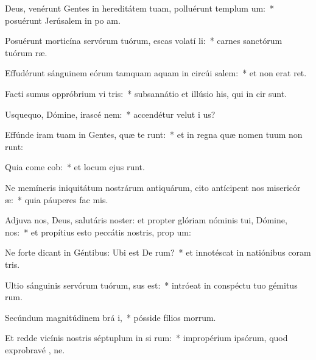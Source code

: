 \item Deus, venérunt Gentes in hereditátem tuam, polluérunt templum  um:~* posuérunt Jerúsalem in po am.
\item Posuérunt morticína servórum tuórum, escas volatí li:~* carnes sanctórum tuórum  ræ.
\item Effudérunt sánguinem eórum tamquam aquam in circúi salem:~* et non erat  ret.
\item Facti sumus oppróbrium vi tris:~* subsannátio et illúsio his, qui in cir  sunt.
\item Usquequo, Dómine, irascé  nem:~* accendétur velut i  us?
\item Effúnde iram tuam in Gentes, quæ te  runt:~* et in regna quæ nomen tuum non runt:
\item Quia come cob:~* et locum ejus runt.
\item Ne memíneris iniquitátum nostrárum antiquárum, cito antícipent nos misericór æ:~* quia páuperes fac  mis.
\item Adjuva nos, Deus, salutáris noster: et propter glóriam nóminis tui, Dómine,  nos:~* et propítius esto peccátis nostris, prop  um:
\item Ne forte dicant in Géntibus: Ubi est De rum?~* et innotéscat in natiónibus coram  tris.
\item Ultio sánguinis servórum tuórum,  sus est:~* intróeat in conspéctu tuo gémitus rum.
\item Secúndum magnitúdinem brá i,~* pósside fílios morrum.
\item Et redde vicínis nostris séptuplum in si rum:~* impropérium ipsórum, quod exprobravé , ne.
